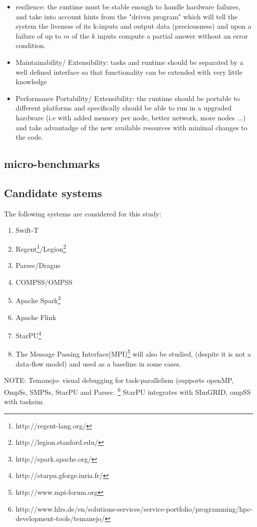 \begin{itemize}
\item resilience: the runtime must be stable enough to handle hardware failures, and take into account hints from the "driven program" which will tell the system the liveness of its k-inputs and output data (preciousness) and upon a failure of up to $m$ of the $k$ inputs compute a partial answer without an error condition.
\item Maintainability/ Extensibility: tasks and runtime should be separated by a well defined interface so that functionality can be extended with very little knowledge 
\item Performance Portability/ Extensibility: the runtime should be portable to different platforms and specifically should be able to run in a upgraded hardware (i.e with added memory per node, better network, more nodes ...) and take advantadge of the new available resources with minimal changes to the code.
\end{itemize}

\subsection{micro-benchmarks}

\subsection{Candidate systems}
The following systems are considered for this study:
\begin{enumerate}
\item Swift-T 
\item Regent\footnote{http://regent-lang.org/}/Legion\footnote{http://legion.stanford.edu/}
\item Parsec/Drague
\item COMPSS/OMPSS
\item Apache Spark\footnote{http://spark.apache.org/}
\item Apache Flink
\item StarPU\footnote{http://starpu.gforge.inria.fr/}
\item The Message Passing Interface(MPI)\footnote{http://www.mpi-forum.org} will also be studied,
(despite it is not a data-flow model) and used as a baseline in some cases.
\end{enumerate}


NOTE: Temanejo- visual debugging for task-parallelism (supports openMP, OmpSs, SMPSs, StarPU and Parsec. \footnote{http://www.hlrs.de/en/solutions-services/service-portfolio/programming/hpc-development-tools/temanejo/}
StarPU integrates with SImGRID, ompSS with tasksim


